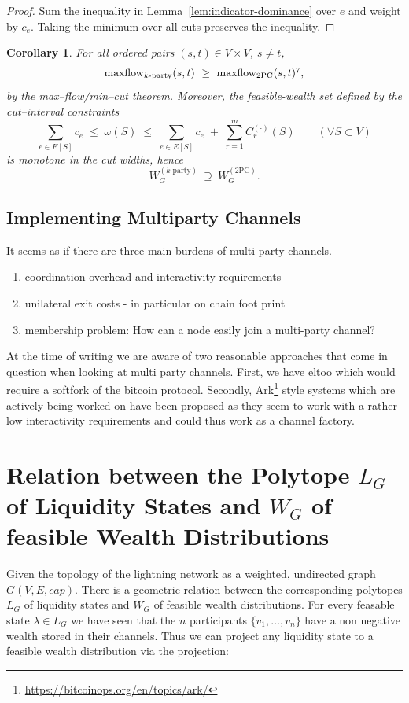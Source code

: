 \documentclass[10pt,twocolumn]{article}
\newtheorem{corollary}{Corollary}[theorem]
\begin{document}
\begin{proof}
Sum the inequality in Lemma~\ref{lem:indicator-dominance} over $e$ and weight by $c_e$.
Taking the minimum over all cuts preserves the inequality.
\end{proof}

\begin{corollary}\label{cor:maxflow-feasibility}
For all ordered pairs $(s,t)\in V\times V$, $s\neq t$,
\[
\operatorname{maxflow}_{k\text{-party}}(s,t)\ \ge\ \operatorname{maxflow}_{\text{2PC}}(s,t)\footnotemark[7]{},
\]%
by the max–flow/min–cut theorem. Moreover, the feasible-wealth set defined by the cut–interval constraints
\[
\sum_{e\in E[S]} c_e \;\le\; \omega(S) \;\le\; \sum_{e\in E[S]} c_e \;+\; \sum_{r=1}^m C^{(\cdot)}_r(S)\qquad(\forall S\subset V)
\]
is monotone in the cut widths, hence
\[
W_G^{(k\text{-party})}\ \supseteq\ W_G^{(\text{2PC})}.
\]
\end{corollary}

\subsection{Implementing Multiparty Channels}
It seems as if there are three main burdens of multi party channels.
\begin{enumerate}
\item coordination overhead and interactivity requirements
\item unilateral exit costs - in particular on chain foot print
  \item membership problem: How can a node easily join a multi-party channel?
\end{enumerate}
At the time of writing we are aware of two reasonable approaches that come in question when looking at multi party channels. First, we have eltoo \cite{decker2018eltoo} which would require a softfork of the bitcoin protocol. Secondly, Ark\footnote{\url{https://bitcoinops.org/en/topics/ark/}} style systems which are actively being worked on have been proposed as they seem to work with a rather low interactivity requirements\cite{Pickhardt2025} and could thus work as a channel factory\cite{burchert2018scalable}. 

\section{Relation between the Polytope $L_G$ of Liquidity States and $W_G$ of feasible Wealth Distributions}
Given the topology of the lightning network as a weighted, undirected graph $G(V,E,cap)$.
There is a geometric relation between the corresponding polytopes $L_G$ of liquidity states and $W_G$ of feasible wealth distributions.
For every feasable state $\lambda \in L_G$ we have seen that the $n$ participants $\{v_1,\dots,v_n\}$ have a non negative wealth stored in their channels.
Thus we can project any liquidity state to a feasible wealth distribution via the projection:
\end{document}
